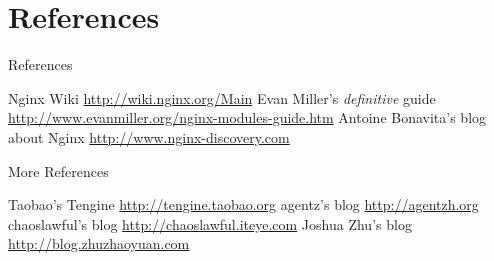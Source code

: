 \documentclass{beamer}
\begin{document}
\section{References}

\begin{frame}{References}
\begin{thebibliography}{10}
  Nginx Wiki 
  \newblock \url{http://wiki.nginx.org/Main}
  Evan Miller's \emph{definitive} guide 
  \newblock \url{http://www.evanmiller.org/nginx-modules-guide.htm}
  Antoine Bonavita's blog about Nginx
  \newblock \url{http://www.nginx-discovery.com}
\end{thebibliography}
\end{frame}

\begin{frame}{More References}
\begin{thebibliography}{10}
  Taobao's Tengine
  \newblock \url{http://tengine.taobao.org}
  agentz's blog
  \newblock \url{http://agentzh.org}
  chaoslawful's blog
  \newblock \url{http://chaoslawful.iteye.com}
  Joshua Zhu’s blog
  \newblock \url{http://blog.zhuzhaoyuan.com}
\end{thebibliography}
 
\end{frame}
\end{document}
